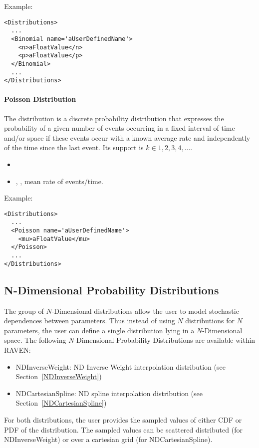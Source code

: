 Example:
\begin{lstlisting}[style=XML]
<Distributions>
  ...
  <Binomial name='aUserDefinedName'>
    <n>aFloatValue</n>
    <p>aFloatValue</p>
  </Binomial>
  ...
</Distributions>
\end{lstlisting}

\paragraph{Poisson Distribution}
\label{Poisson}
The  distribution is a discrete probability distribution that
expresses the probability of a given number of events occurring in a fixed
interval of time and/or space if these events occur with a known average rate
and independently of the time since the last event.
%
Its support is $k \in {1, 2, 3, 4, ...}$.

%
\attrIntro
\vspace{-5mm}
\begin{itemize}
  \itemsep0em
  \item \nameDescription
\end{itemize}
\vspace{-5mm}
\subnodeIntro
\begin{itemize}
  \item {}, , mean rate of
  events/time.
\end{itemize}

Example:
\begin{lstlisting}[style=XML]
<Distributions>
  ...
  <Poisson name='aUserDefinedName'>
    <mu>aFloatValue</mu>
  </Poisson>
  ...
</Distributions>
\end{lstlisting}

\subsection{N-Dimensional Probability Distributions}
\label{subsec:NdDist}
The group of $N$-Dimensional distributions allow the user to model stochastic dependences between parameters. Thus instead of using $N$ distributions for $N$ parameters, the user can define a single distribution lying in a $N$-Dimensional space.
The following $N$-Dimensional Probability Distributions are available within RAVEN:
\begin{itemize}
\item NDInverseWeight: ND Inverse Weight interpolation distribution (see Section~\ref{NDInverseWeight})
\item NDCartesianSpline: ND spline interpolation distribution (see Section~\ref{NDCartesianSpline})
\end{itemize}
For both distributions, the user provides the sampled values of either CDF or PDF of the distribution. The sampled values can be scattered distributed (for NDInverseWeight) or over a cartesian grid (for NDCartesianSpline).


